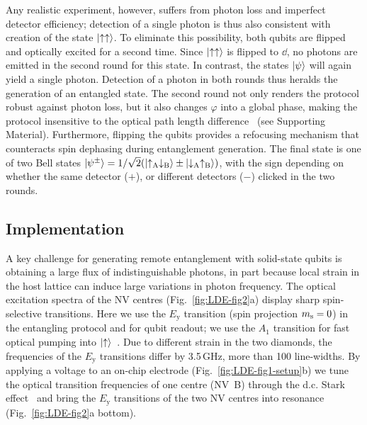 Any realistic experiment, however, suffers from photon loss and imperfect detector efficiency; detection of a single photon is thus also consistent with creation of the state $\left|\uparrow\uparrow\right\rangle$. To eliminate this possibility, both qubits are flipped and optically excited for a second time. Since $\left|\uparrow\uparrow\right\rangle$ is flipped to $\dd$, no photons are emitted in the second round for this state. In contrast, the states $\left|\psi\right\rangle$ will again yield a single photon. Detection of a photon in both rounds thus heralds the generation of an entangled state. The second round not only renders the protocol robust against photon loss, but it also changes $\varphi$ into a global phase, making the protocol insensitive to the optical path length difference~\cite{Barrett_Phys.Rev.A_2005} (see Supporting Material). Furthermore, flipping the qubits provides a refocusing mechanism that counteracts spin dephasing during entanglement generation. The final state is one of two Bell states $\left|\psi^\pm\right\rangle=1/\sqrt{2}(\left|\uparrow_\text{A}\downarrow_\text{B}\right\rangle\pm\left|\downarrow_\text{A}\uparrow_\text{B}\right\rangle)$, with the sign depending on whether the same detector ($+$), or different detectors ($-$) clicked in the two rounds.

\subsection{Implementation}

A key challenge for generating remote entanglement with solid-state qubits is obtaining a large flux of indistinguishable photons, in part because local strain in the host lattice can induce large variations in photon frequency. The optical excitation spectra of the NV centres (Fig.~\ref{fig:LDE-fig2}a) display sharp spin-selective transitions. Here we use the $E_\text{y}$ transition (spin projection $m_\mathrm s = 0$) in the entangling protocol and for qubit readout; we use the $A_1$ transition for fast optical pumping into $\left|\uparrow\right\rangle$~\cite{Robledo_Nature_2011}. Due to different strain in the two diamonds, the frequencies of the $E_\text{y}$ transitions differ by 3.5$\,$GHz, more than 100 line-widths. By applying a voltage to an on-chip electrode (Fig.~\ref{fig:LDE-fig1-setup}b) we tune the optical transition frequencies of one centre (NV~B) through the d.c. Stark effect~\cite{Bernien_Phys.Rev.Lett._2012,Bassett_Phys.Rev.Lett._2011} and bring the $E_\text{y}$ transitions of the two NV centres into resonance (Fig.~\ref{fig:LDE-fig2}a bottom).

